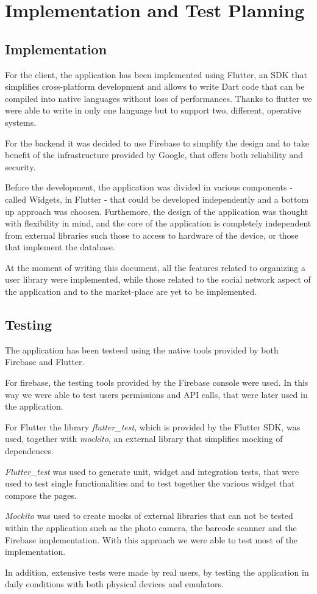 \chapter{Implementation and Test Planning}

\section{Implementation}
For the client, the application has been implemented using Flutter, an SDK that simplifies cross-platform development and allows to write Dart code
that can be compiled into native languages without loss of performances. Thanks to flutter we were able to write in only one language but to support two,
different, operative systems.

For the backend it was decided to use Firebase to simplify the design and to take benefit of the infrastructure provided by Google,
that offers both reliability and security.

Before the development, the application was divided in various components - called Widgets, in Flutter - that could be developed independently and a bottom up approach was choosen.
Furthemore, the design of the application was thought with flexibility in mind, and the core of the application is completely independent from external
libraries such those to access to hardware of the device, or those that implement the database.

At the moment of writing this document, all the features related to organizing a user library were implemented, while those related to the social network 
aspect of the application and to the market-place are yet to be implemented.

\section{Testing}
The application has been testeed using the native tools provided by both Firebase and Flutter.

For firebase, the testing tools provided by the Firebase console were used. In this way we were able to test users permissions and API calls, that were later used in the application.

For Flutter the library \emph{flutter\_test}, which is provided by the Flutter SDK, was used, together with \emph{mockito}, an external library that simplifies mocking of dependences.

\emph{Flutter\_test} was used to generate unit, widget and integration tests, that were used to test single functionalities and to test together the various widget that compose the pages.

\emph{Mockito} was used to create mocks of external libraries that can not be tested within the application such as the photo camera, the barcode scanner and the Firebase implementation.
With this approach we were able to test most of the implementation.

In addition, extensive tests were made by real users, by testing the application in daily conditions with both physical devices and emulators.